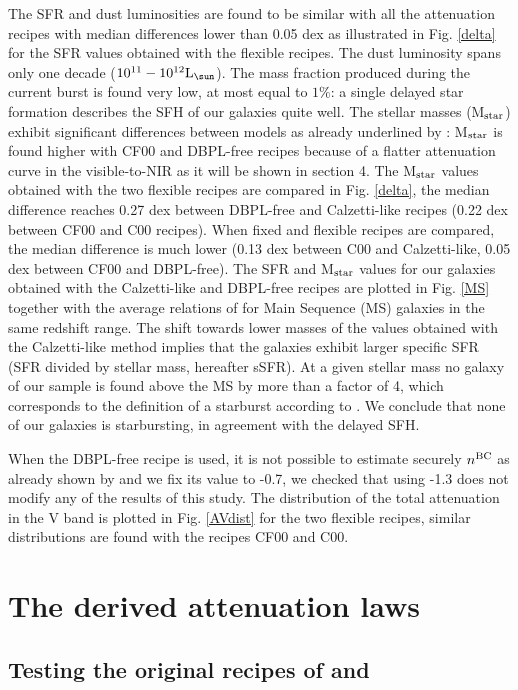 \documentclass{aa}
\begin{document}
The SFR and dust luminosities   are found to be similar with all the  attenuation recipes with median differences lower than 0.05 dex {as illustrated in Fig. \ref{delta} for the SFR values obtained with the flexible recipes}. The dust luminosity spans only one decade  ($\rm 10^{11}-10^{12}L_{\sun}$). The mass fraction produced during the current burst is found very low, at most equal to $1\%$: a single delayed star formation describes the SFH of our galaxies quite well.
The stellar masses (M$_{\rm star}$) exhibit significant differences between models as already underlined by \citet{LoFaro17}:  M$_{\rm star}$ is  found higher with    CF00 and DBPL-free recipes because of a flatter attenuation curve in the visible-to-NIR  as it will be shown in section 4. {The  M$_{\rm star}$ values obtained with the two flexible recipes are compared in Fig. \ref{delta}, the median difference reaches  0.27 dex between DBPL-free and Calzetti-like recipes (0.22 dex between CF00 and C00 recipes).} When fixed and flexible recipes are compared,  the median difference is much lower (0.13 dex between C00 and Calzetti-like, 0.05 dex between CF00 and DBPL-free). The SFR and M$_{\rm star}$ values for our galaxies  obtained with the Calzetti-like and DBPL-free recipes are plotted in Fig. \ref{MS} together with  the average  relations of \citet{Schreiber15} for Main Sequence (MS) galaxies in the same redshift range.  The shift towards lower masses of the values obtained with the Calzetti-like method implies that the galaxies exhibit larger  {specific SFR (SFR divided by stellar mass, hereafter sSFR). At a given stellar mass no galaxy of our sample is found above the MS by  more than a  factor of 4, which corresponds to the definition of a starburst according to  \cite[e.g.,][]{Rodighiero11,Sargent12}. We conclude that none of our galaxies is starbursting, in agreement with the delayed SFH.}

When the DBPL-free recipe is used, it is not possible to estimate securely $n^{\rm BC}$  as already shown by \citet{LoFaro17} and we fix its value to -0.7,  we checked that using -1.3 does not modify any of the results of this study.  
 The distribution of the total attenuation in the V band is plotted in Fig. \ref{AVdist} for the two flexible recipes, similar distributions are found with the recipes CF00 and C00.

\section{The  derived attenuation laws}
\subsection{Testing  the original recipes of \citet{Charlot00} and \citet{Calzetti00}}
\end{document}
